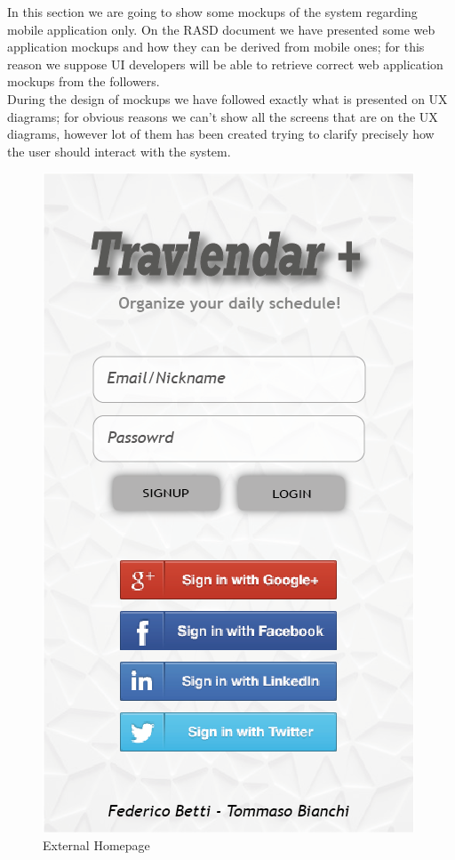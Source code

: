 In this section we are going to show some mockups of the system regarding mobile application only. On the RASD document we have presented some web application mockups and how they can be derived from mobile ones; for this reason we suppose UI developers will be able to retrieve correct web application mockups from the followers.\\
During the design of mockups we have followed exactly what is presented on UX diagrams; for obvious reasons we can't show all the screens that are on the UX diagrams, however lot of them has been created trying to clarify precisely how the user should interact with the system.\\


\begin{figure}[h]
	\centering\includegraphics[scale = 0.3]{Images/Mockups/HomePage.png}{}
	\caption{External Homepage}
\end{figure}